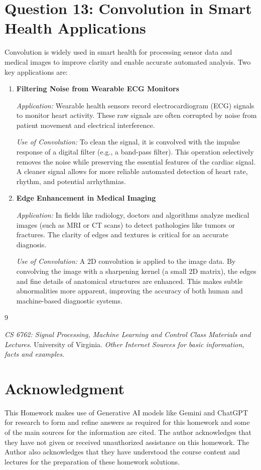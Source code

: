 \documentclass[a4paper,12pt]{article}
\begin{document}
\section{Question 13: Convolution in Smart Health Applications}
Convolution is widely used in smart health for processing sensor data and medical images to improve clarity and enable accurate automated analysis. Two key applications are:

\begin{enumerate}
    \item \textbf{Filtering Noise from Wearable ECG Monitors}
    
    \textit{Application:} Wearable health sensors record electrocardiogram (ECG) signals to monitor heart activity. These raw signals are often corrupted by noise from patient movement and electrical interference.
    
    \textit{Use of Convolution:} To clean the signal, it is convolved with the impulse response of a digital filter (e.g., a band-pass filter). This operation selectively removes the noise while preserving the essential features of the cardiac signal. A cleaner signal allows for more reliable automated detection of heart rate, rhythm, and potential arrhythmias.

    \item \textbf{Edge Enhancement in Medical Imaging}
    
    \textit{Application:} In fields like radiology, doctors and algorithms analyze medical images (such as MRI or CT scans) to detect pathologies like tumors or fractures. The clarity of edges and textures is critical for an accurate diagnosis.
    
    \textit{Use of Convolution:} A 2D convolution is applied to the image data. By convolving the image with a sharpening kernel (a small 2D matrix), the edges and fine details of anatomical structures are enhanced. This makes subtle abnormalities more apparent, improving the accuracy of both human and machine-based diagnostic systems.
\end{enumerate}



\begin{thebibliography}{9}

     \textit{CS 6762: Signal Processing, Machine Learning and Control Class Materials and Lectures}. University of Virginia.
     \textit{Other Internet Sources for basic information, facts and examples}.
    
\end{thebibliography}

\section*{Acknowledgment}
This Homework makes use of  Generative AI models like Gemini and ChatGPT for research to form and refine answers as required for this homework and some of the main sources for the information are cited. The author acknowledges that they have not given or received unauthorized assistance on this homework. The Author also acknowledges that they have understood the course content and lectures for the preparation of these homework solutions.
\end{document}

